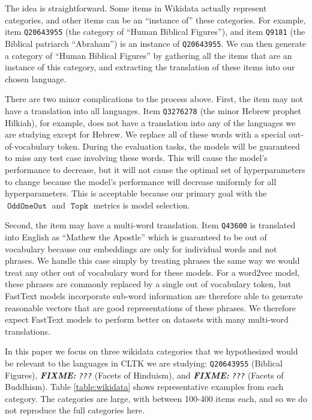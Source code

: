 \documentclass[11pt,a4paper]{article}
\DeclareMathOperator{\OddOneOut}{\texttt{OddOneOut}}
\DeclareMathOperator{\topk}{\texttt{Topk}}
\newcommand{\fixme}[1]{{\color{red}\itshape \textbf{FIXME:} {#1}}}
\begin{document}
The idea is straightforward.
Some items in Wikidata actually represent categories,
and other items can be an ``instance of'' these categories.
For example, item \texttt{Q20643955} (the category of ``Human Biblical Figures''),
and item \texttt{Q9181} (the Biblical patriarch ``Abraham'') is an instance of \texttt{Q20643955}.
We can then generate a category of ``Human Biblical Figures'' by gathering all the items that are an instance of this category,
and extracting the translation of these items into our chosen language.

There are two minor complications to the process above.
First, the item may not have a translation into all languages.
Item \texttt{Q3276278} (the minor Hebrew prophet Hilkiah), for example, does not have a translation into any of the languages we are studying except for Hebrew.
We replace all of these words with a special out-of-vocabulary token.
During the evaluation tasks,
the models will be guaranteed to miss any test case involving these words.
This will cause the model's performance to decrease,
but it will not cause the optimal set of hyperparameters to change because the model's performance will decrease uniformly for all hyperparameters.
This is acceptable because our primary goal with the $\OddOneOut$ and $\topk$ metrics is model selection.

Second, the item may have a multi-word translation.
Item \texttt{Q43600} is translated into English as ``Mathew the Apostle'' which is guaranteed to be out of vocabulary because our embeddings are only for individual words and not phrases.
We handle this case simply by treating phrases the same way we would treat any other out of vocabulary word for these models.
For a word2vec model, these phrases are commonly replaced by a single out of vocabulary token,
but FastText models incorporate sub-word information are therefore able to generate reasonable vectors that are good representations of these phrases.
We therefore expect FastText models to perform better on datasets with many multi-word translations.

In this paper we focus on three wikidata categories that we hypothesized would be relevant to the languages in CLTK we are studying:
\texttt{Q20643955} (Biblical Figures),
\fixme{\texttt{???}} (Facets of Hinduism),
and \fixme{\texttt{???}} (Facets of Buddhism).
Table \ref{table:wikidata} shows representative examples from each category.
The categories are large, with between 100-400 items each, and so we do not reproduce the full categories here.
\end{document}
